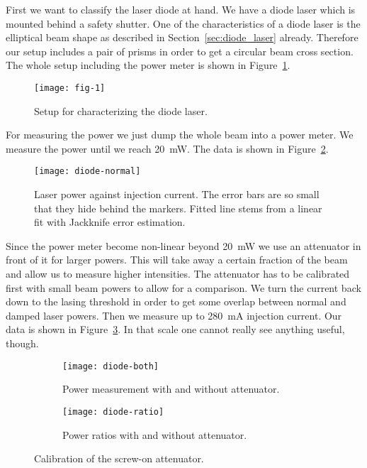 \documentclass[11pt, english, fleqn, DIV=15, headinclude, BCOR=2cm]{scrreprt}
\begin{document}
First we want to classify the laser diode at hand. We have a diode laser which
is mounted behind a safety shutter. One of the characteristics of a diode laser
is the elliptical beam shape as described in Section~\ref{sec:diode_laser}
already. Therefore our setup includes a pair of prisms in order to get a
circular beam cross section. The whole setup including the power meter is shown
in Figure~\ref{fig:fig-1}.

\begin{figure}
    \centering
    \texttt{[image: fig-1]}
    \caption{%
        Setup for characterizing the diode laser.
        \parencite[Figure~1]{lab-course/doubling/manual}
    }
    \label{fig:fig-1}
\end{figure}

For measuring the power we just dump the whole beam into a power meter. We
measure the power until we reach \SI{20}{\milli\watt}. 
The data is shown in Figure~\ref{fig:diode-normal}.

\begin{figure}
    \centering
    \texttt{[image: diode-normal]}
    \caption{%
        Laser power against injection current. The error bars are so small that
        they hide behind the markers. Fitted line stems from a linear fit with
        Jackknife error estimation.
    }
    \label{fig:diode-normal}
\end{figure}

Since the power meter become non-linear beyond \SI{20}{\milli\watt} we use an
attenuator in front of it for larger powers. This will take away a certain
fraction of the beam and allow us to measure higher intensities. The attenuator
has to be calibrated first with small beam powers to allow for a comparison. We
turn the current back down to the lasing threshold in order to get some overlap
between normal and damped laser powers. Then we measure up to
\SI{280}{\milli\ampere} injection current. Our data is shown in
Figure~\ref{fig:diode-both}. In that scale one cannot really see anything
useful, though.

\begin{figure}
    \centering
    \begin{subfigure}[c]{0.48\linewidth}
    \centering
    \texttt{[image: diode-both]}
    \caption{%
        Power measurement with and without attenuator.
    }
    \label{fig:diode-both}
    \end{subfigure}
    \hfill
    \begin{subfigure}[c]{0.48\linewidth}
    \centering
    \texttt{[image: diode-ratio]}
    \caption{%
        Power ratios with and without attenuator.
    }
    \label{fig:diode-ratio}
    \end{subfigure}
    \caption{%
        Calibration of the screw-on attenuator.
    }
\end{figure}
\end{document}
